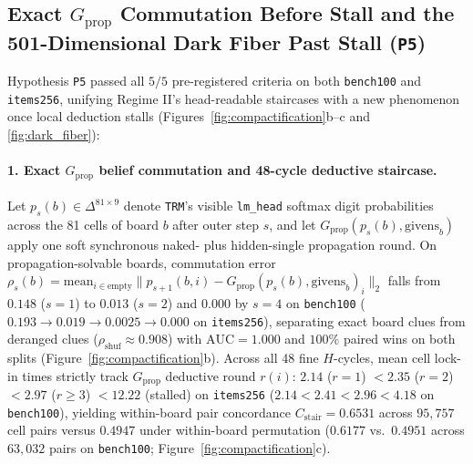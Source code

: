 \documentclass[10pt,letterpaper]{article}
\newcommand{\Gprop}{G_{\mathrm{prop}}}
\begin{document}
\subsection{Exact $\Gprop$ Commutation Before Stall and the 501-Dimensional Dark Fiber Past Stall (\texttt{P5})}

Hypothesis \texttt{P5} passed all $5/5$ pre-registered criteria on both \texttt{bench100} and \texttt{items256}, unifying Regime II's head-readable staircases with a new phenomenon once local deduction stalls (Figures~\ref{fig:compactification}b--c and \ref{fig:dark_fiber}):

\paragraph{1. Exact $\Gprop$ belief commutation and 48-cycle deductive staircase.} Let $p_s(b) \in \Delta^{81\times 9}$ denote \texttt{TRM}'s visible \texttt{lm\_head} softmax digit probabilities across the 81 cells of board $b$ after outer step $s$, and let $\Gprop(p_s(b), \mathrm{givens}_b)$ apply one soft synchronous naked- plus hidden-single propagation round. On propagation-solvable boards, commutation error $\rho_s(b) = \mathrm{mean}_{i\in\mathrm{empty}}\|p_{s+1}(b,i) - \Gprop(p_s(b),\mathrm{givens}_b)_i\|_2$ falls from $0.148$ ($s=1$) to $0.013$ ($s=2$) and $\mathbf{0.000}$ by $s=4$ on \texttt{bench100} ($0.193 \to 0.019 \to 0.0025 \to 0.000$ on \texttt{items256}), separating exact board clues from deranged clues ($\rho_{\mathrm{shuf}} \approx 0.908$) with \textbf{$\mathrm{AUC} = 1.000$} and $100\%$ paired wins on both splits (Figure~\ref{fig:compactification}b). Across all 48 fine $H$-cycles, mean cell lock-in times strictly track $\Gprop$ deductive round $r(i)$: $2.14$ ($r=1$) $< 2.35$ ($r=2$) $< 2.97$ ($r\ge 3$) $< 12.22$ (stalled) on \texttt{items256} ($2.14 < 2.41 < 2.96 < 4.18$ on \texttt{bench100}), yielding within-board pair concordance $C_{\mathrm{stair}} = 0.6531$ across $95{,}757$ cell pairs versus $0.4947$ under within-board permutation ($0.6177$ vs.\ $0.4951$ across $63{,}032$ pairs on \texttt{bench100}; Figure~\ref{fig:compactification}c).
\end{document}
